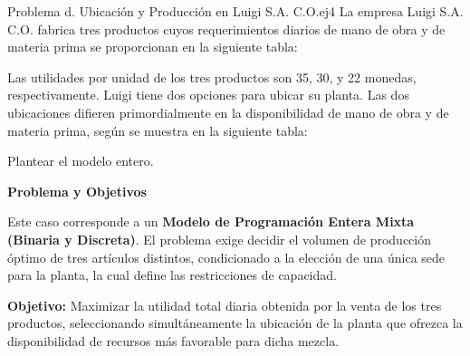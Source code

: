 \documentclass[10pt,a4paper]{article}
\begin{document}
\newpage

\begin{ejercicio}{Problema d. Ubicación y Producción en Luigi S.A. C.O.}{ej4}
La empresa Luigi S.A. C.O. fabrica tres productos cuyos requerimientos diarios de mano de obra y de materia prima se proporcionan en la siguiente tabla:

\begin{center}
\end{center}

Las utilidades por unidad de los tres productos son 35, 30, y 22 monedas, respectivamente. Luigi tiene dos opciones para ubicar su planta. Las dos ubicaciones difieren primordialmente en la disponibilidad de mano de obra y de materia prima, según se muestra en la siguiente tabla:

\begin{center}
\end{center}
Plantear el modelo entero.
\end{ejercicio}

\vspace{3mm}

\textbf{Problema y Objetivos}

Este caso corresponde a un \textbf{Modelo de Programación Entera Mixta (Binaria y Discreta)}. El problema exige decidir el volumen de producción óptimo de tres artículos distintos, condicionado a la elección de una única sede para la planta, la cual define las restricciones de capacidad.

\textbf{Objetivo:} Maximizar la utilidad total diaria obtenida por la venta de los tres productos, seleccionando simultáneamente la ubicación de la planta que ofrezca la disponibilidad de recursos más favorable para dicha mezcla.
\end{document}
